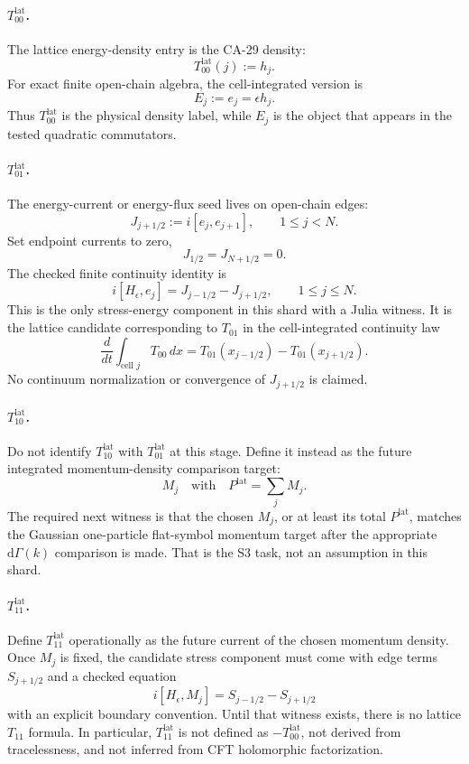 \paragraph{\(T_{00}^{\mathrm{lat}}\).}
The lattice energy-density entry is the CA-29 density:
\[
  T_{00}^{\mathrm{lat}}(j):=h_j .
\]
For exact finite open-chain algebra, the cell-integrated version is
\[
  E_j:=e_j=\epsilon h_j .
\]
Thus \(T_{00}^{\mathrm{lat}}\) is the physical density label, while \(E_j\) is
the object that appears in the tested quadratic commutators.

\paragraph{\(T_{01}^{\mathrm{lat}}\).}
The energy-current or energy-flux seed lives on open-chain edges:
\[
  J_{j+1/2}:=i[e_j,e_{j+1}],
  \qquad 1\le j<N .
\]
Set endpoint currents to zero,
\[
  J_{1/2}=J_{N+1/2}=0 .
\]
The checked finite continuity identity is
\[
  i[H_\epsilon,e_j]
  =
  J_{j-1/2}-J_{j+1/2},
  \qquad 1\le j\le N .
\]
This is the only stress-energy component in this shard with a Julia witness.
It is the lattice candidate corresponding to \(T_{01}\) in the cell-integrated
continuity law
\[
  \frac{d}{dt}\int_{\text{cell }j}T_{00}\,dx
  =
  T_{01}(x_{j-1/2})-T_{01}(x_{j+1/2}) .
\]
No continuum normalization or convergence of \(J_{j+1/2}\) is claimed.

\paragraph{\(T_{10}^{\mathrm{lat}}\).}
Do not identify \(T_{10}^{\mathrm{lat}}\) with \(T_{01}^{\mathrm{lat}}\) at this
stage.  Define it instead as the future integrated momentum-density comparison
target:
\[
  M_j \quad\text{with}\quad P^{\mathrm{lat}}=\sum_j M_j .
\]
The required next witness is that the chosen \(M_j\), or at least its total
\(P^{\mathrm{lat}}\), matches the Gaussian one-particle flat-symbol momentum
target after the appropriate \(\mathrm{d}\Gamma(k)\) comparison is made.  That is
the S3 task, not an assumption in this shard.

\paragraph{\(T_{11}^{\mathrm{lat}}\).}
Define \(T_{11}^{\mathrm{lat}}\) operationally as the future current of the
chosen momentum density.  Once \(M_j\) is fixed, the candidate stress component
must come with edge terms \(S_{j+1/2}\) and a checked equation
\[
  i[H_\epsilon,M_j]
  =
  S_{j-1/2}-S_{j+1/2}
\]
with an explicit boundary convention.  Until that witness exists, there is no
lattice \(T_{11}\) formula.  In particular, \(T_{11}^{\mathrm{lat}}\) is not
defined as \(-T_{00}^{\mathrm{lat}}\), not derived from tracelessness, and not
inferred from CFT holomorphic factorization.

